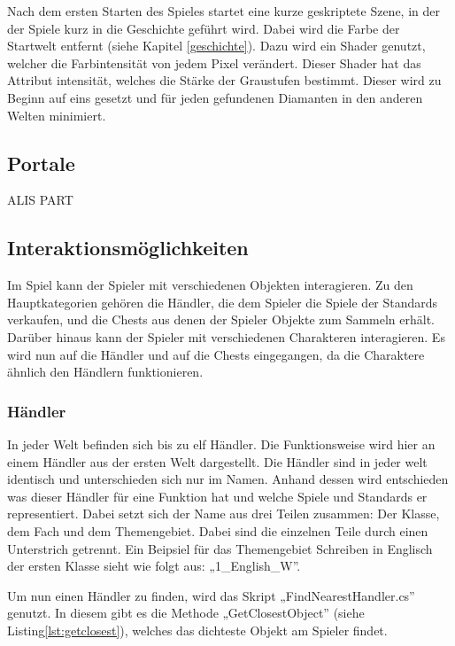 Nach dem ersten Starten des Spieles startet eine kurze geskriptete Szene, in der der Spiele kurz in die Geschichte geführt wird. Dabei wird die Farbe der Startwelt entfernt  (siehe Kapitel \ref{geschichte}). Dazu wird ein Shader genutzt, welcher die Farbintensität von jedem Pixel verändert. Dieser Shader hat das Attribut intensität, welches die Stärke der Graustufen bestimmt. Dieser wird zu Beginn auf eins gesetzt und für jeden gefundenen Diamanten in den anderen Welten minimiert.
    
\subsection{Portale}

ALIS PART

\subsection{Interaktionsmöglichkeiten}

Im Spiel kann der Spieler mit verschiedenen Objekten interagieren. Zu den Hauptkategorien gehören die Händler, die dem Spieler die Spiele der Standards verkaufen, und die Chests aus denen der Spieler Objekte zum Sammeln erhält. Darüber hinaus kann der Spieler mit verschiedenen Charakteren interagieren. Es wird nun auf die Händler und auf die Chests eingegangen, da die Charaktere ähnlich den Händlern funktionieren.

\subsubsection{Händler}

In jeder Welt befinden sich bis zu elf Händler. Die Funktionsweise wird hier an einem Händler aus der ersten Welt dargestellt. Die Händler sind in jeder welt identisch und unterschieden sich nur im Namen. Anhand dessen wird entschieden was dieser Händler für eine Funktion hat und welche Spiele und Standards er representiert. Dabei setzt sich der Name aus drei Teilen zusammen: Der Klasse, dem Fach und dem Themengebiet. Dabei sind die einzelnen Teile durch einen Unterstrich getrennt. Ein Beipsiel für das Themengebiet Schreiben in Englisch der ersten Klasse sieht wie folgt aus: „1\_English\_W”. 

Um nun einen Händler zu finden, wird das Skript „FindNearestHandler.cs” genutzt. In diesem gibt es die Methode „GetClosestObject” (siehe Listing\ref{lst:getclosest}), welches das dichteste Objekt am Spieler findet.

